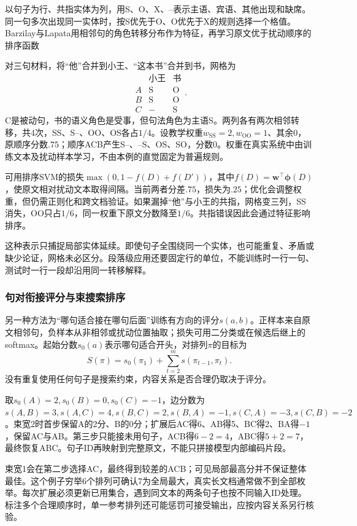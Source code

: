 以句子为行、共指实体为列，用S、O、X、--表示主语、宾语、其他出现和缺席。同一句多次出现同一实体时，按S优先于O、O优先于X的规则选择一个格值。Barzilay与Lapata用相邻句的角色转移分布作为特征，再学习原文优于扰动顺序的排序函数

对三句材料，将“他”合并到小王、“这本书”合并到书，网格为
\[
 \begin{array}{c|cc}
    &\text{小王}&\text{书}\\ \hline
 A&\mathrm S&\mathrm O\\
 B&\mathrm S&\mathrm O\\
 C&-&\mathrm S
 \end{array}.
\]
C是被动句，书的语义角色是受事，但句法角色为主语S。两列各有两次相邻转移，共4次，SS、S--、OO、OS各占$1/4$。设教学权重$w_{\mathrm{SS}}=2,w_{\mathrm{OO}}=1$、其余0，原顺序分数$.75$；顺序ACB产生S--、--S、OS、SO，分数0。权重在真实系统中由训练文本及扰动样本学习，不由本例的直觉固定为普遍规则。

可用排序SVM的损失$\max(0,1-f(D)+f(D'))$，其中$f(D)=\bm w^\top\bm\phi(D)$，使原文相对扰动文本取得间隔。当前两者分差$.75$，损失为$.25$；优化会调整权重，但仍需正则化和跨文档验证。如果漏掉“他”与小王的共指，网格变三列，SS消失，OO只占$1/6$，同一权重下原文分数降至$1/6$。共指错误因此会通过特征影响排序。

这种表示只捕捉局部实体延续。即使句子全围绕同一个实体，也可能重复、矛盾或缺少论证，网格未必区分。段落级应用还要固定行的单位，不能训练时一行一句、测试时一行一段却沿用同一转移解释。

\subsubsection{句对衔接评分与束搜索排序}
\label{sec:nlp-analysis-pair-ordering}

另一种方法为“哪句适合接在哪句后面”训练有方向的评分$s(a,b)$。正样本来自原文相邻句，负样本从非相邻或扰动位置抽取；损失可用二分类或在候选后继上的softmax。起始分数$s_0(a)$表示哪句适合开头，对排列$\pi$的目标为
\[
 S(\pi)=s_0(\pi_1)+\sum_{t=2}^m s(\pi_{t-1},\pi_t).
\]
没有重复使用任何句子是搜索约束，内容关系是否合理仍取决于评分。

取$s_0(A)=2,s_0(B)=0,s_0(C)=-1$，边分数为$s(A,B)=3,s(A,C)=4,s(B,C)=2,s(B,A)=-1,s(C,A)=-3,s(C,B)=-2$。束宽2时首步保留A的2分、B的0分；扩展后AC得6、AB得5、BC得2、BA得$-1$，保留AC与AB。第三步只能接未用句子，ACB得$6-2=4$，ABC得$5+2=7$，最终恢复ABC。句子ID再映射到完整原文，不能只拼接模型内部编码片段。

束宽1会在第二步选择AC，最终得到较差的ACB；可见局部最高分并不保证整体最佳。这个例子穷举6个排列可确认7为全局最大，真实长文档通常做不到全部枚举。每次扩展必须更新已用集合，遇到同文本的两条句子也按不同输入ID处理。标注多个合理顺序时，单一参考排列还可能惩罚可接受输出，应按内容关系另行核验。

